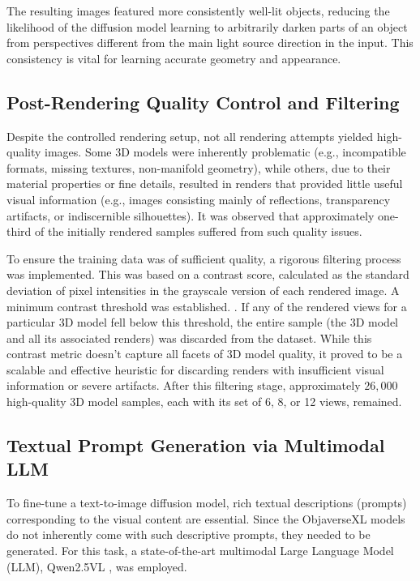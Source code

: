 The resulting images featured more consistently well-lit objects, reducing the likelihood of the diffusion model learning to arbitrarily darken parts of an object from perspectives different from the main light source direction in the input. This consistency is vital for learning accurate geometry and appearance.

\subsection{Post-Rendering Quality Control and Filtering}\label{ssec:quality-control}
Despite the controlled rendering setup, not all rendering attempts yielded high-quality images. Some 3D models were inherently problematic (e.g., incompatible formats, missing textures, non-manifold geometry), while others, due to their material properties or fine details, resulted in renders that provided little useful visual information (e.g., images consisting mainly of reflections, transparency artifacts, or indiscernible silhouettes). It was observed that approximately one-third of the initially rendered samples suffered from such quality issues.

To ensure the training data was of sufficient quality, a rigorous filtering process was implemented. This was based on a contrast score, calculated as the standard deviation of pixel intensities in the grayscale version of each rendered image. A minimum contrast threshold was established. . If any of the rendered views for a particular 3D model fell below this threshold, the entire sample (the 3D model and all its associated renders) was discarded from the dataset. While this contrast metric doesn't capture all facets of 3D model quality, it proved to be a scalable and effective heuristic for discarding renders with insufficient visual information or severe artifacts. After this filtering stage, approximately $26,000$ high-quality 3D model samples, each with its set of 6, 8, or 12 views, remained.

\subsection{Textual Prompt Generation via Multimodal LLM}\label{ssec:text-generation}
To fine-tune a text-to-image diffusion model, rich textual descriptions (prompts) corresponding to the visual content are essential. Since the ObjaverseXL models do not inherently come with such descriptive prompts, they needed to be generated. For this task, a state-of-the-art multimodal Large Language Model (LLM), Qwen2.5VL \cite{qwen25vl}, was employed.


